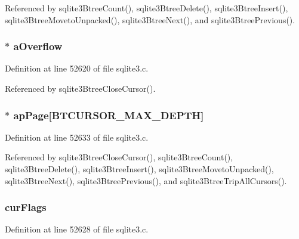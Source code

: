 Referenced by sqlite3\+Btree\+Count(), sqlite3\+Btree\+Delete(), sqlite3\+Btree\+Insert(), sqlite3\+Btree\+Moveto\+Unpacked(), sqlite3\+Btree\+Next(), and sqlite3\+Btree\+Previous().

\hypertarget{struct_bt_cursor_a7deae3222686e7a2ef3247ee13dc5323}{}
\subsubsection[{a\+Overflow}]{$\ast$ a\+Overflow}\label{struct_bt_cursor_a7deae3222686e7a2ef3247ee13dc5323}


Definition at line 52620 of file sqlite3.\+c.



Referenced by sqlite3\+Btree\+Close\+Cursor().

\hypertarget{struct_bt_cursor_a48324efc61de2768ab83887316925682}{}
\subsubsection[{ap\+Page}]{$\ast$ ap\+Page\mbox{[}{\bf B\+T\+C\+U\+R\+S\+O\+R\+\_\+\+M\+A\+X\+\_\+\+D\+E\+P\+T\+H}\mbox{]}}\label{struct_bt_cursor_a48324efc61de2768ab83887316925682}


Definition at line 52633 of file sqlite3.\+c.



Referenced by sqlite3\+Btree\+Close\+Cursor(), sqlite3\+Btree\+Count(), sqlite3\+Btree\+Delete(), sqlite3\+Btree\+Insert(), sqlite3\+Btree\+Moveto\+Unpacked(), sqlite3\+Btree\+Next(), sqlite3\+Btree\+Previous(), and sqlite3\+Btree\+Trip\+All\+Cursors().

\hypertarget{struct_bt_cursor_a3bae5f0b147a8a42b815f3512dc3b46e}{}
\subsubsection[{cur\+Flags}]{ cur\+Flags}\label{struct_bt_cursor_a3bae5f0b147a8a42b815f3512dc3b46e}


Definition at line 52628 of file sqlite3.\+c.



